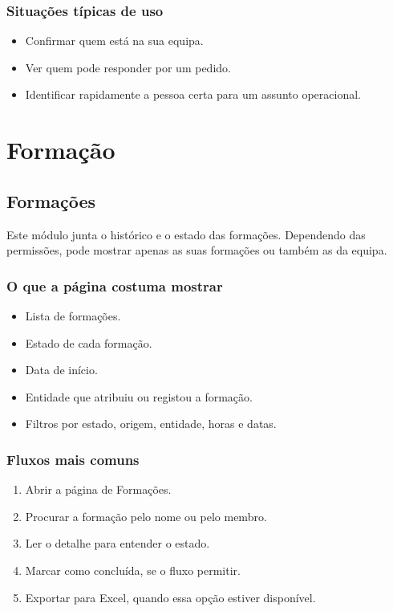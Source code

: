\subsection{Situações típicas de uso}
\begin{itemize}
  \item Confirmar quem está na sua equipa.
  \item Ver quem pode responder por um pedido.
  \item Identificar rapidamente a pessoa certa para um assunto operacional.
\end{itemize}

\chapter{Formação}
\section{Formações}
Este módulo junta o histórico e o estado das formações. Dependendo das permissões, pode mostrar apenas as suas formações ou também as da equipa.

\subsection{O que a página costuma mostrar}
\begin{itemize}
  \item Lista de formações.
  \item Estado de cada formação.
  \item Data de início.
  \item Entidade que atribuiu ou registou a formação.
  \item Filtros por estado, origem, entidade, horas e datas.
\end{itemize}

\subsection{Fluxos mais comuns}
\begin{enumerate}
  \item Abrir a página de Formações.
  \item Procurar a formação pelo nome ou pelo membro.
  \item Ler o detalhe para entender o estado.
  \item Marcar como concluída, se o fluxo permitir.
  \item Exportar para Excel, quando essa opção estiver disponível.
\end{enumerate}

